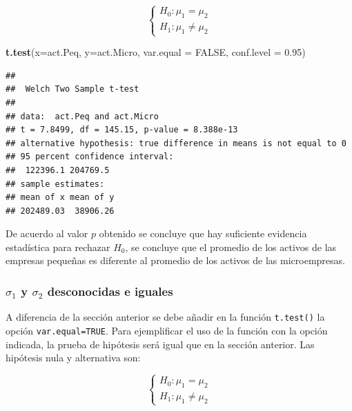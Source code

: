 \documentclass[letterpaper,]{book}
\newenvironment{Shaded}{\begin{snugshade}}{\end{snugshade}}
\newcommand{\DataTypeTok}[1]{\textcolor[rgb]{0.13,0.29,0.53}{#1}}
\newcommand{\FloatTok}[1]{\textcolor[rgb]{0.00,0.00,0.81}{#1}}
\newcommand{\KeywordTok}[1]{\textcolor[rgb]{0.13,0.29,0.53}{\textbf{#1}}}
\newcommand{\NormalTok}[1]{#1}
\newcommand{\OtherTok}[1]{\textcolor[rgb]{0.56,0.35,0.01}{#1}}
\begin{document}
\begin{equation} 
\begin{cases} 
H_0: \mu_1 = \mu_2 \\ 
H_1: \mu_1 \neq \mu_2
\end{cases} 
\end{equation}

\begin{Shaded}
\begin{Highlighting}[]
\KeywordTok{t.test}\NormalTok{(}\DataTypeTok{x=}\NormalTok{act.Peq, }\DataTypeTok{y=}\NormalTok{act.Micro, }\DataTypeTok{var.equal =} \OtherTok{FALSE}\NormalTok{,}
       \DataTypeTok{conf.level =} \FloatTok{0.95}\NormalTok{)}
\end{Highlighting}
\end{Shaded}

\begin{verbatim}
## 
##  Welch Two Sample t-test
## 
## data:  act.Peq and act.Micro
## t = 7.8499, df = 145.15, p-value = 8.388e-13
## alternative hypothesis: true difference in means is not equal to 0
## 95 percent confidence interval:
##  122396.1 204769.5
## sample estimates:
## mean of x mean of y 
## 202489.03  38906.26
\end{verbatim}

De acuerdo al valor \(p\) obtenido se concluye que hay suficiente evidencia estadística para rechazar \(H_0\), se concluye que el promedio de los activos de las empresas pequeñas es diferente al promedio de los activos de las microempresas.

\hypertarget{sigma_1-y-sigma_2-desconocidas-e-iguales}{%
\subsubsection{\texorpdfstring{\(\sigma_1\) y \(\sigma_2\) desconocidas e iguales}{\textbackslash{}sigma\_1 y \textbackslash{}sigma\_2 desconocidas e iguales}}\label{sigma_1-y-sigma_2-desconocidas-e-iguales}}

A diferencia de la sección anterior se debe añadir en la función \texttt{t.test()} la opción \texttt{var.equal=TRUE}. Para ejemplificar el uso de la función con la opción indicada, la prueba de hipótesis será igual que en la sección anterior. Las hipótesis nula y alternativa son:

\begin{equation} 
\begin{cases} 
H_0: \mu_1 = \mu_2 \\ 
H_1: \mu_1 \neq \mu_2
\end{cases} 
\end{equation}
\end{document}
